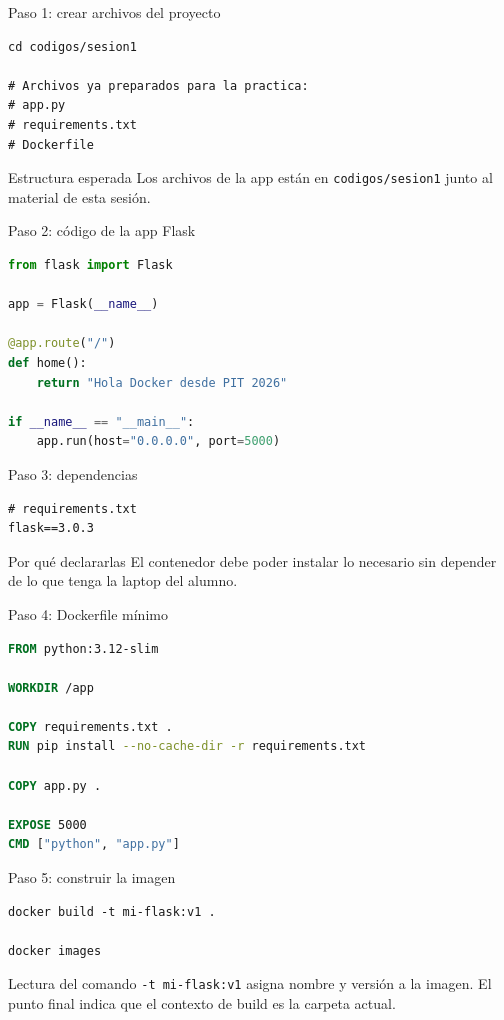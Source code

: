 \documentclass[aspectratio=169]{beamer}
\begin{document}
\begin{frame}[fragile]{Paso 1: crear archivos del proyecto}
\begin{lstlisting}[style=terminal]
cd codigos/sesion1

# Archivos ya preparados para la practica:
# app.py
# requirements.txt
# Dockerfile
\end{lstlisting}
  \begin{alertblock}{Estructura esperada}
    Los archivos de la app están en \texttt{codigos/sesion1} junto al material de esta sesión.
  \end{alertblock}
\end{frame}

\begin{frame}[fragile]{Paso 2: código de la app Flask}
\begin{lstlisting}[language=Python]
from flask import Flask

app = Flask(__name__)

@app.route("/")
def home():
    return "Hola Docker desde PIT 2026"

if __name__ == "__main__":
    app.run(host="0.0.0.0", port=5000)
\end{lstlisting}
\end{frame}

\begin{frame}[fragile]{Paso 3: dependencias}
\begin{lstlisting}[style=terminal]
# requirements.txt
flask==3.0.3
\end{lstlisting}
  \begin{block}{Por qué declararlas}
    El contenedor debe poder instalar lo necesario sin depender de lo que tenga la laptop del alumno.
  \end{block}
\end{frame}

\begin{frame}[fragile]{Paso 4: Dockerfile mínimo}
\begin{lstlisting}[language=Dockerfile]
FROM python:3.12-slim

WORKDIR /app

COPY requirements.txt .
RUN pip install --no-cache-dir -r requirements.txt

COPY app.py .

EXPOSE 5000
CMD ["python", "app.py"]
\end{lstlisting}
\end{frame}

\begin{frame}[fragile]{Paso 5: construir la imagen}
\begin{lstlisting}[style=terminal]
docker build -t mi-flask:v1 .

docker images
\end{lstlisting}
  \begin{exampleblock}{Lectura del comando}
    \texttt{-t mi-flask:v1} asigna nombre y versión a la imagen. El punto final indica que el contexto de build es la carpeta actual.
  \end{exampleblock}
\end{frame}
\end{document}
